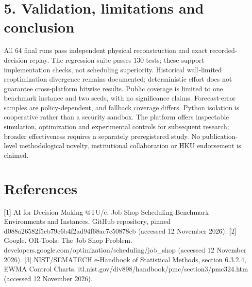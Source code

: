 \documentclass[10pt,a4paper]{article}
\begin{document}
\section*{5. Validation, limitations and conclusion}
All 64 final runs pass independent physical reconstruction and exact recorded-decision replay. The regression suite passes 130 tests; these support implementation checks, not scheduling superiority. Historical wall-limited reoptimization divergence remains documented; deterministic effort does not guarantee cross-platform bitwise results. Public coverage is limited to one benchmark instance and two seeds, with no significance claims. Forecast-error samples are policy-dependent, and fallback coverage differs. Python isolation is cooperative rather than a security sandbox. The platform offers inspectable simulation, optimization and experimental controls for subsequent research; broader effectiveness requires a separately preregistered study. No publication-level methodological novelty, institutional collaboration or HKU endorsement is claimed.

\section*{References}
[1] AI for Decision Making @TU/e. Job Shop Scheduling Benchmark Environments and Instances. GitHub repository, pinned d088a26582f5cb79c6b4f2ad94f68ac7c50878cb (accessed 12 November 2026). [2] Google. OR-Tools: The Job Shop Problem. developers.google.com/optimization/scheduling/job\_shop (accessed 12 November 2026). [3] NIST/SEMATECH e-Handbook of Statistical Methods, section 6.3.2.4, EWMA Control Charts. itl.nist.gov/div898/handbook/pmc/section3/pmc324.htm (accessed 12 November 2026).
\end{document}
